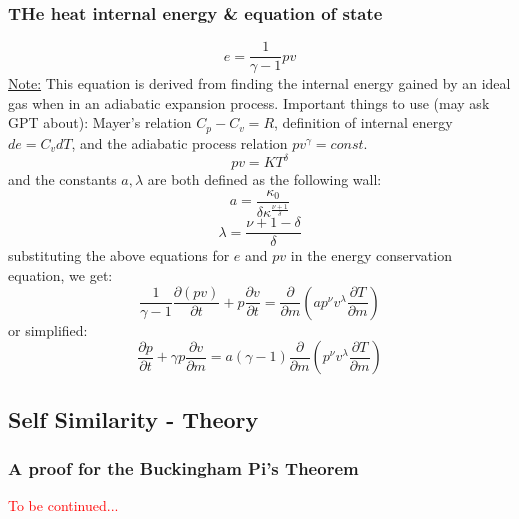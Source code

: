 \documentclass{article}
\begin{document}
\subsubsection{THe heat internal energy \& equation of state}
\begin{equation}
    e = \frac{1}{\gamma - 1}pv
\end{equation}
\underline{Note:} This equation is derived from finding the internal energy gained
by an ideal gas when in an adiabatic expansion process.
Important things to use (may ask GPT about): Mayer's relation $C_p - C_v = R$, definition of internal energy $de = C_v dT$,
and the adiabatic process relation $pv^\gamma = const$.
\begin{equation}
    pv = KT^\delta
\end{equation}
and the constants $a, \lambda$ are both defined as the following wall:
\begin{equation}
    a = \frac{\kappa_0}{\delta \kappa^{\frac{\nu + 1}{\delta}}}
\end{equation}
\begin{equation}
    \lambda = \frac{\nu + 1 - \delta}{\delta}
\end{equation}
substituting the above equations for $e$ and $pv$ in the energy conservation equation, we get:
\begin{equation}
    \frac{1}{\gamma - 1}  \frac{\partial (pv)}{\partial t} + p \frac{\partial v}{\partial t} = \frac{\partial}{\partial m} \left( a p^{\nu} v^{\lambda} \frac{\partial T}{\partial m} \right)
\end{equation}
or simplified:
\begin{equation}
    \frac{\partial p}{\partial t} + \gamma p \frac{\partial v}{\partial m} = a(\gamma - 1) \frac{\partial}{\partial m} \left( p^{\nu} v^{\lambda} \frac{\partial T}{\partial m} \right)
\end{equation}

\subsection{Self Similarity - Theory}
\subsubsection{A proof for the Buckingham Pi's Theorem}
\textcolor{red}{To be continued...}
\end{document}
